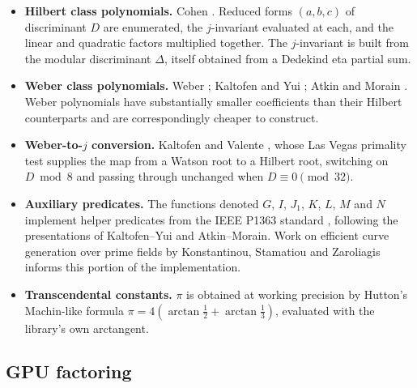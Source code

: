 \documentclass[11pt,a4paper]{article}
\begin{document}
\begin{itemize}
  \item \textbf{Hilbert class polynomials.} Cohen
    \cite[Algorithm 7.6.1, p.~415]{cohen1993}. Reduced forms $(a,b,c)$ of
    discriminant $D$ are enumerated, the $j$-invariant evaluated at each,
    and the linear and quadratic factors multiplied together. The
    $j$-invariant is built from the modular discriminant $\Delta$, itself
    obtained from a Dedekind eta partial sum.
  \item \textbf{Weber class polynomials.} Weber
    \cite[\S127]{weber1908}; Kaltofen and Yui \cite{kaltofen1991};
    Atkin and Morain \cite{atkin1993}. Weber polynomials have
    substantially smaller coefficients than their Hilbert counterparts
    and are correspondingly cheaper to construct.
  \item \textbf{Weber-to-$j$ conversion.} Kaltofen and Valente
    \cite{kaltofen1989}, whose Las Vegas primality test supplies the map
    from a Watson root to a Hilbert root, switching on $D \bmod 8$ and
    passing through unchanged when $D \equiv 0 \pmod{32}$.
  \item \textbf{Auxiliary predicates.} The functions denoted $G$, $I$,
    $J_1$, $K$, $L$, $M$ and $N$ implement helper predicates from the
    IEEE P1363 standard \cite{ieee1363}, following the presentations of
    Kaltofen--Yui and Atkin--Morain. Work on efficient curve generation
    over prime fields by Konstantinou, Stamatiou and Zaroliagis
    \cite{konstantinou2002} informs this portion of the implementation.
  \item \textbf{Transcendental constants.} $\pi$ is obtained at working
    precision by Hutton's Machin-like formula
    $\pi = 4(\arctan\frac{1}{2} + \arctan\frac{1}{3})$, evaluated with the
    library's own arctangent.
\end{itemize}

\subsection{GPU factoring}
\end{document}
